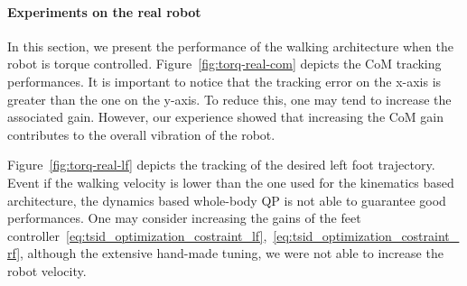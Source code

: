 \paragraph{Experiments on the real robot}
In this section, we present the performance of the walking architecture when the robot is torque controlled. 
Figure~\ref{fig:torq-real-com} depicts the CoM tracking performances. It is important to notice that the tracking error on the x-axis is greater than the one on the y-axis. To reduce this, one may tend to increase the associated gain. However, our experience showed that increasing the CoM gain contributes to the overall vibration of the robot.
\par
Figure~\ref{fig:torq-real-lf} depicts the tracking of the desired left foot trajectory. Event if the walking velocity is lower than the one used for the kinematics based architecture, the dynamics based whole-body QP is not able to guarantee good performances. One may consider increasing the gains of the feet controller~\eqref{eq:tsid_optimization_costraint_lf},~\eqref{eq:tsid_optimization_costraint_rf}, although the extensive hand-made tuning, we were not able to increase the robot velocity.

